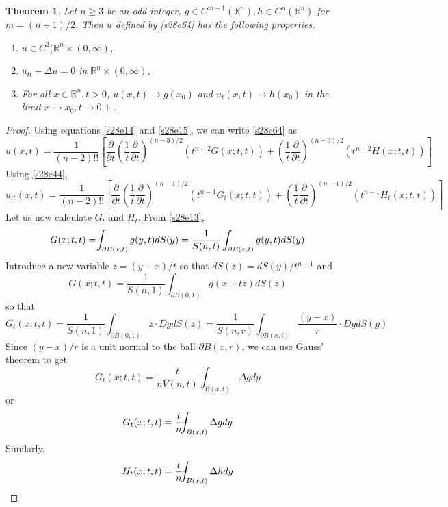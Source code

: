 \documentclass{article}
\newcommand{\fint}{\mbox{--}\mkern-16mu\int}
\theoremstyle{plain}
\newtheorem{thm}{Theorem}
\numberwithin{thm}{section}
\theoremstyle{plain}
\numberwithin{prop}{section}
\theoremstyle{definition}
\numberwithin{defn}{section}
\theoremstyle{remark}
\numberwithin{equation}{section}
\begin{document}
\begin{thm}\label{s28t1}
Let $n \ge 3$ be an odd integer, $g \in C^{m+1}(\mathbb{R}^n), h \in C^n(\mathbb{R}^n)$ for $m = (n + 1)/2$. Then
$u$ defined by \eqref{s28e64} has the following properties.
\begin{enumerate}
\item $u \in C^2(\mathbb{R}^n \times (0, \infty)$,
\item $u_{tt} - \Delta u = 0$ in $\mathbb{R}^n \times (0, \infty)$,
\item For all $x \in \mathbb{R}^n, t > 0$, $u(x, t) \rightarrow g(x_0)$ and $u_t(x, t) \rightarrow h(x_0)$ in the
limit $x \rightarrow x_0, t \rightarrow 0+$.
\end{enumerate}
\end{thm}
\begin{proof}
Using equations \eqref{s28e14} and \eqref{s28e15}, we can write \eqref{s28e64} as
\begin{equation}\label{s28e71}
u(x,t) = \frac{1}{(n-2)!!}\left[\frac{\partial}{\partial t}
\left(\frac{1}{t}\frac{\partial}{\partial t}\right)^{(n-3)/2}(t^{n-2}G(x; t,t)) +
\left(\frac{1}{t}\frac{\partial}{\partial t}\right)^{(n-3)/2}(t^{n-2}H(x; t,t))\right]
\end{equation}
Using \eqref{s28e44},
\begin{equation}\label{s28e72}
u_{tt}(x,t) = \frac{1}{(n-2)!!}\left[\frac{\partial}{\partial t}
\left(\frac{1}{t}\frac{\partial}{\partial t}\right)^{(n-1)/2}(t^{n-1}G_t(x; t,t)) +
\left(\frac{1}{t}\frac{\partial}{\partial t}\right)^{(n-1)/2}(t^{n-1}H_t(x; t,t))\right]
\end{equation}
Let us now calculate $G_t$ and $H_t$. From \eqref{s28e13},
\[
G(x;t,t) = \fint_{\partial B(x,t)}g(y,t)dS(y) = \frac{1}{S(n,t)}\int_{\partial B(x,t)} g(y,t)dS(y)
\]
Introduce a new variable $z = (y - x)/t$ so that $dS(z) = dS(y)/t^{n-1}$ and
\[
G(x;t,t) = \frac{1}{S(n,1)}\int_{\partial B(0,1)} g(x + tz) dS(z)
\]
so that
\[
G_t(x;t,t) = \frac{1}{S(n,1)}\int_{\partial B(0,1)} z\cdot Dg dS(z) = 
\frac{1}{S(n,r)}\int_{\partial B(x,t)} \frac{(y - x)}{r}\cdot Dg dS(y)
\]
Since $(y - x)/r$ is a unit normal to the ball $\partial B(x,r)$, we can use Gauss' theorem to get
\[
G_t(x;t,t) = \frac{t}{nV(n,t)}\int_{B(x,t)} \Delta g dy
\]
or
\begin{equation}\label{s28e73}
G_t(x;t,t) = \frac{t}{n}\fint_{B(x,t)} \Delta g dy
\end{equation}
Similarly,
\begin{equation}\label{s28e74}
H_t(x;t,t) = \frac{t}{n}\fint_{B(x,t)} \Delta h dy

\end{equation}
\end{proof}
\end{document}
